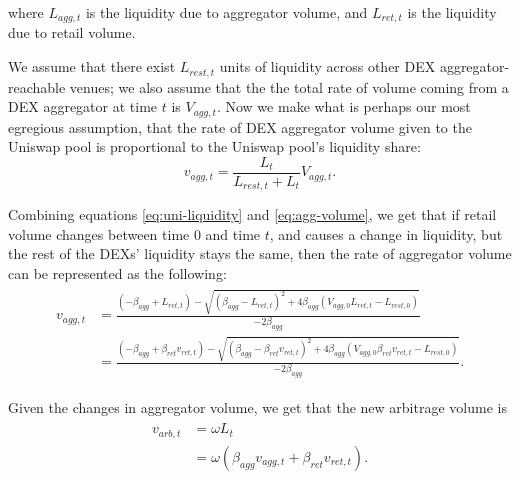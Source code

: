     where $L_{agg,t}$ is the liquidity due to aggregator volume, and $L_{ret,t}$ is the liquidity due to retail volume.

    We assume that there exist $L_{rest,t}$ units of liquidity across other DEX aggregator-reachable venues; we also assume that the the total rate of volume coming from a DEX aggregator at time $t$ is $V_{agg,t}$. Now we make what is perhaps our most egregious assumption, that the rate of DEX aggregator volume given to the Uniswap pool is proportional to the Uniswap pool's liquidity share:
        \begin{equation} \label{eq:agg-volume}
            v_{agg,t} = \frac{L_t}{L_{rest, t}+L_t}V_{agg,t}.
        \end{equation}

    Combining equations \ref{eq:uni-liquidity} and \ref{eq:agg-volume}, we get that if retail volume changes between time $0$ and time $t$, and causes a change in liquidity, but the rest of the DEXs' liquidity stays the same, then the rate of aggregator volume can be represented as the following:
        \begin{align} \label{eq:v-agg-wrt-retail}
            \begin{split}
                v_{agg,t} 
                & = \frac{(-\beta_{agg} + L_{ret,t}) - \sqrt{(\beta_{agg}-L_{ret,t})^2+4\beta_{agg}(V_{agg,0}L_{ret,t}-L_{rest,0})}}{-2\beta_{agg}} \\
                & = \frac{(-\beta_{agg} + \beta_{ret} v_{ret,t}) - \sqrt{(\beta_{agg}-\beta_{ret} v_{ret,t})^2+4\beta_{agg}(V_{agg,0}\beta_{ret} v_{ret,t}-L_{rest,0})}}{-2\beta_{agg}}.
            \end{split}
        \end{align}

    Given the changes in aggregator volume, we get that the new arbitrage volume is
        \begin{align}
            \begin{split}
                v_{arb,t} 
                & = \omega L_t \\
                & = \omega \left( \beta_{agg} v_{agg,t} + \beta_{ret} v_{ret,t} \right).%
            \end{split}
        \end{align}

